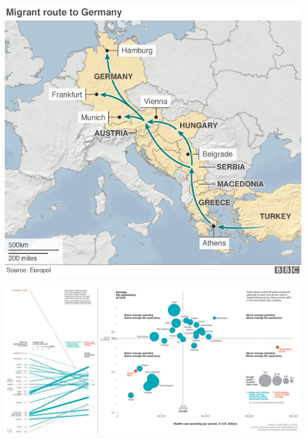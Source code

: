 \documentclass{beamer}
\begin{document}
\begin{frame}
\centering
\includegraphics[width=\textwidth,keepaspectratio]{img/bon_exemple2.png}
\end{frame}

\begin{frame}
\centering
\includegraphics[width=\textwidth,keepaspectratio]{img/bon_exemple3.jpg}
\end{frame}
\end{document}

